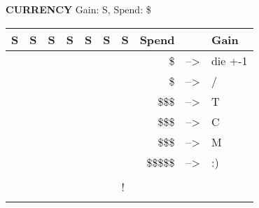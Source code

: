 \begin{flushleft}
  \textbf{CURRENCY} \textcolor{supplemental}{Gain: S, Spend: \$}
\end{flushleft}
\label{currency}
\begin{tabular}{|
>{\columncolor{currency}}l |
>{\columncolor{currency}}l |
>{\columncolor{currency}}l |
>{\columncolor{currency}}l |
>{\columncolor{currency}}l |
>{\columncolor{currency}}l |
>{\columncolor{currency}}l |
r c l} \hline{-------}
{\color[HTML]{000000} S} &
  {\color[HTML]{000000} S} &
  {\color[HTML]{000000} S} &
  {\color{currency} S} &
  {\color{currency} S} &
  {\color{currency} S} &
  {\color{currency} S} &
  Spend & & Gain \\ \hline{-------}
{\color[HTML]{000000} } &
  {\color[HTML]{000000} } &
  {\color[HTML]{000000} } &
  {\color[HTML]{000000} } &
  {\color[HTML]{000000} } &
  {\color[HTML]{000000} } &
  {\color[HTML]{000000} } &
  \$ & --\textgreater{} & die +-1 \\ \hline{-------}
{\color[HTML]{000000} } &
  {\color[HTML]{000000} } &
  {\color[HTML]{000000} } &
  {\color[HTML]{000000} } &
  {\color[HTML]{000000} } &
  {\color[HTML]{000000} } &
  {\color[HTML]{000000} } &
  \$ & --\textgreater{} & / \\ \hline{-------}
{\color[HTML]{000000} } &
  {\color[HTML]{000000} } &
  {\color[HTML]{000000} } &
  {\color[HTML]{000000} } &
  {\color[HTML]{000000} } &
  {\color[HTML]{000000} } &
  {\color[HTML]{000000} } &
  \$\$\$ & --\textgreater{} & T \\ \hline{-------}
{\color[HTML]{000000} } &
  {\color[HTML]{000000} } &
  {\color[HTML]{000000} } &
  {\color[HTML]{000000} } &
  {\color[HTML]{000000} } &
  {\color[HTML]{000000} } &
  {\color[HTML]{000000} } &
  \$\$\$ & --\textgreater{} & C \\ \hline{-------}
{\color[HTML]{000000} } &
  {\color[HTML]{000000} } &
  {\color[HTML]{000000} } &
  {\color[HTML]{000000} } &
  {\color[HTML]{000000} } &
  {\color[HTML]{000000} } &
  {\color[HTML]{000000} } &
  \$\$\$ & --\textgreater{} & M \\ \hline{-------}
{\color[HTML]{000000} } &
  {\color[HTML]{000000} } &
  {\color[HTML]{000000} } &
  {\color[HTML]{000000} } &
  {\color[HTML]{000000} } &
  {\color[HTML]{000000} } &
  {\color[HTML]{000000} } &
  \$\$\$\$\$ & --\textgreater{} & :) \\ \hline{-------}
{\color[HTML]{000000} } &
  {\color[HTML]{000000} } &
  {\color[HTML]{000000} } &
  {\color[HTML]{000000} } &
  {\color[HTML]{000000} } &
  {\color[HTML]{000000} } &
  {\color[HTML]{000000} } & & & \\ \hline{-------}
{\color[HTML]{000000} } &
  {\color[HTML]{000000} } &
  {\color[HTML]{000000} } &
  {\color[HTML]{000000} } &
  {\color[HTML]{000000} } &
  {\color[HTML]{000000} } &
  {\color[HTML]{000000} {!}} & & & \\ \hline{-------}
\end{tabular}

